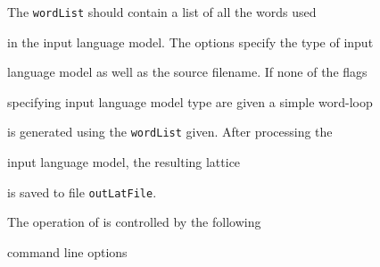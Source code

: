 The {\tt wordList} should contain a list of all the words used


in the input language model. The options specify the type of input


language model as well as the source filename. If none of the flags


specifying input language model type are given a simple word-loop


is generated using the {\tt wordList} given. After processing the


input language model, the resulting lattice


is saved to file {\tt outLatFile}.





The operation of  is controlled by the following


command line options


